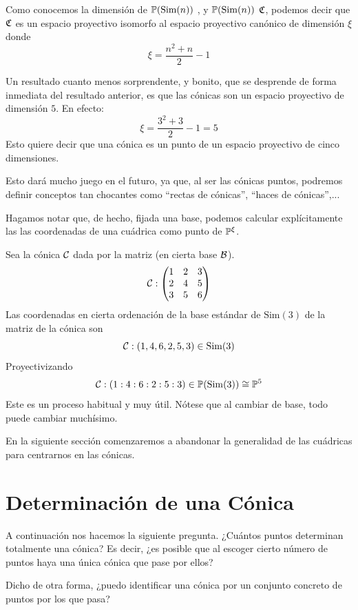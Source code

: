 Como conocemos la dimensión de $\mathbb{P}(\mathrm{Sim}(n))$ , y $\mathbb{P}(\mathrm{Sim}(n))$  $\mathfrak{C}$, podemos decir que $\mathfrak{C}$ es un espacio proyectivo isomorfo al espacio proyectivo canónico de dimensión $\xi$ donde \[\xi=\frac{n^2+n}{2}-1\]

\begin{obs}
	\label{C8_obs_conica_p5}
	Un resultado cuanto menos sorprendente, y bonito, que se desprende de forma inmediata del resultado anterior, es que las cónicas son un espacio proyectivo de dimensión $5$. En efecto:
	\[\xi=\frac{3^2+3}{2}-1=5\]
	Esto quiere decir que una cónica es un punto de un espacio proyectivo de cinco dimensiones.
	
	Esto dará mucho juego en el futuro, ya que, al ser las cónicas puntos, podremos definir conceptos tan chocantes como ``rectas de cónicas'', ``haces de cónicas'',...
\end{obs}
Hagamos notar que, de hecho, fijada una base, podemos calcular explícitamente las las coordenadas de una cuádrica como punto de $\mathbb{P}^\xi$.
\begin{exa}
	\label{C8_exa_coordenadas_conica_p5}
	Sea la cónica $\mathcal{C}$ dada por la matriz (en cierta base $\mathcal{B}$).
	\[\mathcal{C}:\begin{pmatrix}
	1 & 2 & 3\\
	2 & 4 & 5\\
	3 & 5 & 6
	\end{pmatrix}\]
	Las coordenadas en cierta ordenación de la base estándar de $\mathrm{Sim}(3)$ de la matriz de la cónica son
	\[\mathcal{C}:(1,4,6,2,5,3)\in\mathrm{Sim}(3)\]
	Proyectivizando
	\[\mathcal{C}:(1:4:6:2:5:3)\in\mathbb{P}(\mathrm{Sim}(3))\cong\mathbb{P}^5\]
	Este es un proceso habitual y muy útil. Nótese que al cambiar de base, todo puede cambiar muchísimo.
\end{exa}
En la siguiente sección comenzaremos a abandonar la generalidad de las cuádricas para centrarnos en las cónicas.

\section{Determinación de una Cónica}
A continuación nos hacemos la siguiente pregunta. ¿Cuántos puntos determinan totalmente una cónica? Es decir, ¿es posible que al escoger cierto número de puntos haya una única cónica que pase por ellos?

Dicho de otra forma, ¿puedo identificar una cónica por un conjunto concreto de puntos por los que pasa?
